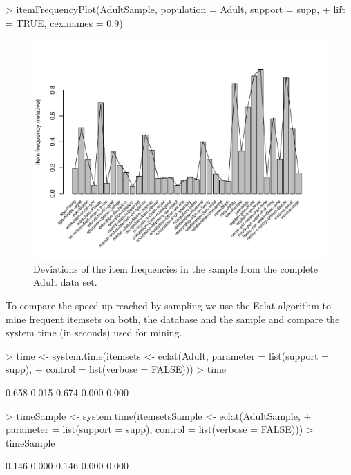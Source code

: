 \documentclass[10pt,a4paper]{article}
\begin{document}
\begin{Schunk}
\begin{Sinput}
> itemFrequencyPlot(AdultSample, population = Adult, support = supp, 
+     lift = TRUE, cex.names = 0.9)
\end{Sinput}
\end{Schunk}
\begin{figure}
\centering
\includegraphics{arules-035}
\caption{Deviations of the item frequencies in the sample from 
the complete Adult data set.}
\label{fig:itemFrequencyPlot3}
\end{figure}

To compare the speed-up reached by sampling we use the Eclat algorithm
to mine frequent itemsets on both, the database and the sample
and compare the system time (in seconds) used for mining.

\begin{Schunk}
\begin{Sinput}
> time <- system.time(itemsets <- eclat(Adult, parameter = list(support = supp), 
+     control = list(verbose = FALSE)))
> time
\end{Sinput}
\begin{Soutput}
[1] 0.658 0.015 0.674 0.000 0.000
\end{Soutput}
\begin{Sinput}
> timeSample <- system.time(itemsetsSample <- eclat(AdultSample, 
+     parameter = list(support = supp), control = list(verbose = FALSE)))
> timeSample
\end{Sinput}
\begin{Soutput}
[1] 0.146 0.000 0.146 0.000 0.000
\end{Soutput}
\end{Schunk}
\end{document}
